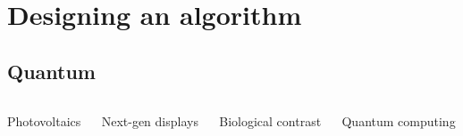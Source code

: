 \documentclass[aspectratio=169]{beamer}
\begin{document}
\section{Designing an algorithm}

\subsection{Quantum}

\begin{frame}
  \vspace{-1cm}
  \begin{columns}
    \begin{column}{0.25\textwidth}
      \begin{center}
        Photovoltaics
      \end{center}
    \end{column}

    \begin{column}{0.25\textwidth}
      \begin{center}
        Next-gen displays
      \end{center}
    \end{column}

    \begin{column}{0.25\textwidth}
      \begin{center}
        Biological contrast
      \end{center}
    \end{column}

    \begin{column}{0.25\textwidth}
      \begin{center}
        Quantum computing
      \end{center}
    \end{column}

  \end{columns}


\end{frame}
\end{document}

